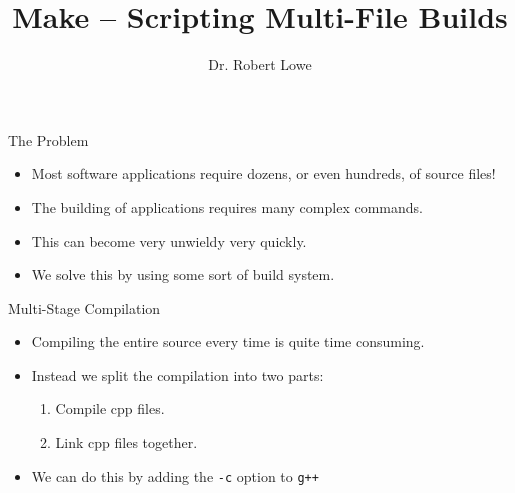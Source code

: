 \documentclass[]{beamer}
\title{Make -- Scripting Multi-File Builds}
\author{Dr. Robert Lowe\\}
\institute[Maryville College] %
{
  Division of Mathematics and Computer Science\\
  Maryville College
}
\date[]{}
\begin{document}
\begin{frame}
  \titlepage
\end{frame}





\begin{frame}{The Problem}
\begin{itemize}[<+->]
    \item Most software applications require dozens, or even hundreds,
        of source files!
    \item The building of applications requires many complex commands.
    \item This can become very unwieldy very quickly.
    \item We solve this by using some sort of build system.
\end{itemize}
\end{frame}


\begin{frame}{Multi-Stage Compilation}
\begin{itemize}[<+->]
    \item Compiling the entire source every time is quite
    time consuming.
    \item Instead we split the compilation into two parts:
    \begin{enumerate}
        \item Compile cpp files.
        \item Link cpp files together.
    \end{enumerate}
    \item We can do this by adding the \texttt{-c} option to
        \texttt{g++}
\end{itemize}
\end{frame}
\end{document}
